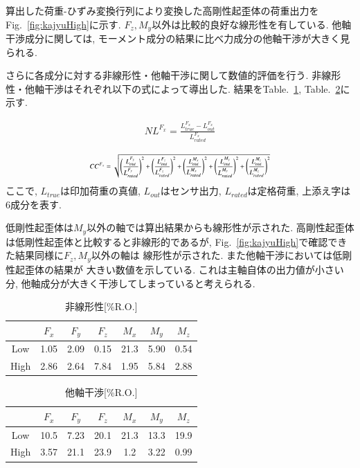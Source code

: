 算出した荷重-ひずみ変換行列により変換した高剛性起歪体の荷重出力を
Fig.~\ref{fig:kajyuHigh}に示す. 
$F_z, M_y$以外は比較的良好な線形性を有している. 
他軸干渉成分に関しては, モーメント成分の結果に比べ力成分の他軸干渉が大きく見られる.

さらに各成分に対する非線形性・他軸干渉に関して数値的評価を行う. 
非線形性・他軸干渉はそれぞれ以下の式によって導出した. 
結果をTable.~\ref{tb:hisennkeisei}, Table.~\ref{tb:tajikukannsyou}に示す. 

\begin{eqnarray}
  NL^{F_x} = \frac{L^{F_x}_{true} - L^{F_x}_{out}}{L^{F_x}_{rated}}
\end{eqnarray}

\begin{eqnarray}
  \scalebox{0.7}{$\displaystyle
  CC^{F_x} = \sqrt{\Biggl(\frac{L^{F_y}_{out}}{L^{F_y}_{rated}}\Biggr)^2 + \Biggl(\frac{L^{F_z}_{out}}{L^{F_z}_{rated}}\Biggr)^2 + \Biggl(\frac{L^{M_x}_{out}}{L^{M_x}_{rated}}\Biggr)^2 + \Biggl(\frac{L^{M_y}_{out}}{L^{M_y}_{rated}}\Biggr)^2 + \Biggl(\frac{L^{M_z}_{out}}{L^{M_z}_{rated}}\Biggr)^2}
$}
\end{eqnarray}
ここで, $L_{true}$は印加荷重の真値, $L_{out}$はセンサ出力, $L_{rated}$は定格荷重, 上添え字は6成分を表す. 

低剛性起歪体は$M_y$以外の軸では算出結果からも線形性が示された. 
高剛性起歪体は低剛性起歪体と比較すると非線形的であるが, 
Fig.~\ref{fig:kajyuHigh}で確認できた結果同様に$F_z, M_y$以外の軸は
線形性が示された. また他軸干渉においては低剛性起歪体の結果が
大きい数値を示している. これは主軸自体の出力値が小さい分, 
他軸成分が大きく干渉してしまっていると考えられる. 
\begin{table}[h]
  \caption{非線形性[\%R.O.]\label{tb:hisennkeisei}}
  \begin{center}
   \begin{tabular}{ c c c c c c c }
    \hline
     & $F_x$ & $F_y$ & $F_z$ & $M_x$ & $M_y$ & $M_z$  \\
    \hline
    Low & 1.05 & 2.09 & 0.15 & 21.3 & 5.90 & 0.54 \\
     \hline
    High & 2.86 & 2.64 & 7.84 & 1.95 & 5.84 & 2.88  \\
    \hline   
   \end{tabular}
  \end{center}
 \end{table}

 \begin{table}[h]
  \caption{他軸干渉[\%R.O.]\label{tb:tajikukannsyou}}
  \begin{center}
   \begin{tabular}{ c c c c c c c }
    \hline
     & $F_x$ & $F_y$ & $F_z$ & $M_x$ & $M_y$ & $M_z$  \\
    \hline
    Low & 10.5 & 7.23 & 20.1 & 21.3 & 13.3 & 19.9  \\
     \hline
    High & 3.57 & 21.1 & 23.9 & 1.2 & 3.22 & 0.99 \\
    \hline   
   \end{tabular}
  \end{center}
 \end{table}

